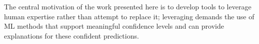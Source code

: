 \documentclass[11pt]{article}
\begin{document}
The central motivation of the work presented here is to develop tools to leverage human expertise rather than attempt to replace it; leveraging demands the use of ML methods that support meaningful confidence levels and can provide explanations for these confident predictions.




 
 
\end{document}
